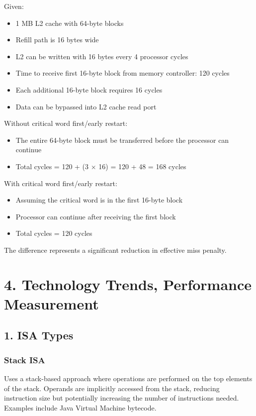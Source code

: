 \documentclass[12pt]{article}
\begin{document}
Given:
\begin{itemize}
    \item 1 MB L2 cache with 64-byte blocks
    \item Refill path is 16 bytes wide
    \item L2 can be written with 16 bytes every 4 processor cycles
    \item Time to receive first 16-byte block from memory controller: 120 cycles
    \item Each additional 16-byte block requires 16 cycles
    \item Data can be bypassed into L2 cache read port
\end{itemize}

Without critical word first/early restart:
\begin{itemize}
    \item The entire 64-byte block must be transferred before the processor can continue
    \item Total cycles = 120 + (3 $\times$ 16) = 120 + 48 = 168 cycles
\end{itemize}

With critical word first/early restart:
\begin{itemize}
    \item Assuming the critical word is in the first 16-byte block
    \item Processor can continue after receiving the first block
    \item Total cycles = 120 cycles
\end{itemize}

The difference represents a significant reduction in effective miss penalty.

\section*{4. Technology Trends, Performance Measurement}

\subsection*{1. ISA Types}

\subsubsection*{Stack ISA}
Uses a stack-based approach where operations are performed on the top elements of the stack. Operands are implicitly accessed from the stack, reducing instruction size but potentially increasing the number of instructions needed. Examples include Java Virtual Machine bytecode.
\end{document}
